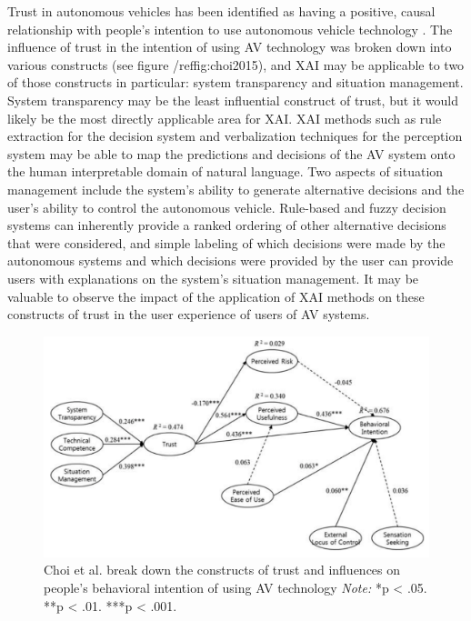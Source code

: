Trust in autonomous vehicles has been identified as having a positive, causal relationship with people's intention to use autonomous vehicle technology \cite{Choi2015InvestigatingTI}.  The influence of trust in the intention of using AV technology was broken down into various constructs (see figure /ref{fig:choi2015}), and XAI may be applicable to two of those constructs in particular:  system transparency and situation management.  System transparency may be the least influential construct of trust, but it would likely be the most directly applicable area for XAI.  XAI methods such as rule extraction for the decision system and verbalization techniques for the perception system may be able to map the predictions and decisions of the AV system onto the human interpretable domain of natural language.  Two aspects of situation management include the system's ability to generate alternative decisions and the user's ability to control the autonomous vehicle.  Rule-based and fuzzy decision systems can inherently provide a ranked ordering of other alternative decisions that were considered, and simple labeling of which decisions were made by the autonomous systems and which decisions were provided by the user can provide users with explanations on the system's situation management.  It may be valuable to observe the impact of the application of XAI methods on these constructs of trust in the user experience of users of AV systems.

\begin{figure}
    \includegraphics[width=\textwidth]{media/choi2015}
    \caption{Choi et al. break down the constructs of trust and influences on people's behavioral intention of using AV technology \cite{Choi2015InvestigatingTI}  \textit{Note:} *p < .05. **p < .01. ***p < .001.}
    \label{fig:choi2015}
\end{figure}

